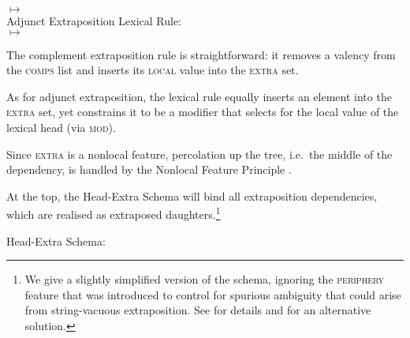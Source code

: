 \documentclass[output=paper,biblatex,babelshorthands,newtxmath,draftmode,colorlinks,citecolor=brown]{langscibook}
\begin{document}
$\mapsto$ \\
\flushright{}
\z
\eas
Adjunct Extraposition Lexical Rule:\\
$\mapsto$ \\
\flushright{}
\zs


The complement extraposition rule is straightforward: it removes a
valency from the \textsc{comps} list and inserts its \textsc{local}
value into the \textsc{extra} set. 

As for adjunct extraposition, the lexical rule  equally inserts an
element into the \textsc{extra} set, yet constrains it to be a
modifier that selects for the local value of the lexical head (via
\textsc{mod}). 

Since \textsc{extra} is a nonlocal feature, percolation up the tree,
i.e.\ the middle of the dependency, is handled by the Nonlocal Feature
Principle
\citep[]{Pollard:Sag:94}.

At the top, the Head-Extra Schema will bind all extraposition
dependencies, which are realised as extraposed daughters.\footnote{We
  give a slightly simplified version of the schema, ignoring the
  \textsc{periphery} feature that was introduced to control for spurious
  ambiguity that could arise from string-vacuous extraposition. See
  \citet[--305]{Keller:95} for details and
  \citet{Crysmann2005a-u} for an alternative solution. }
\begin{exe}
  \ex Head-Extra Schema:

\end{exe}
\end{document}

